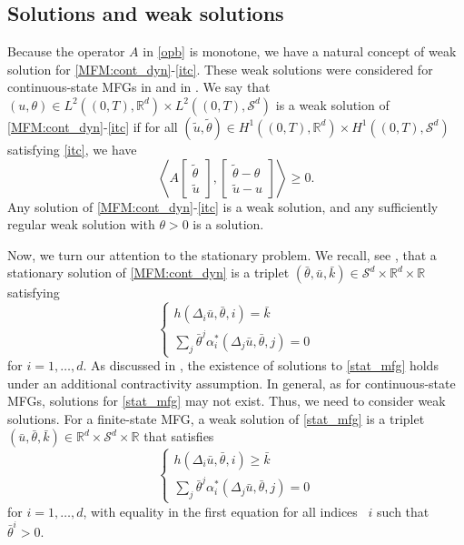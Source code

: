 \documentclass[12pt]{amsart}
\newcommand{\Rr}{{\mathbb{R}}}
\newcommand{\1}{{\chi}}
\newcommand{\Ss}{\mathcal{S}}
\theoremstyle{definition}
\begin{document}
\subsection{Solutions and weak solutions}

Because the operator $A$ in \eqref{opb} is monotone, we have a natural
concept of weak solution for \eqref{MFM:cont_dyn}-\eqref{itc}. 
These weak solutions were considered for continuous-state MFGs in \cite{AFG} and in \cite{FG2}.
We say that $(u, \theta)\in L^2((0,T), \Rr^d)\times L^2((0,T), \Ss^d) $ is a weak solution of \eqref{MFM:cont_dyn}-\eqref{itc} if
for all  $(\tilde u, \tilde \theta)\in H^1((0,T), \Rr^d)\times H^1((0,T), \Ss^d)$ satisfying \eqref{itc}, 
we have
\[
\left\langle
A\left[
\begin{array}{c}
\tilde \theta\\
\tilde u
\end{array}\right], 
\left[
\begin{array}{c}
\tilde \theta-\theta\\
\tilde u-u
\end{array}\right]
\right\rangle\geq 0.
\]
Any solution of \eqref{MFM:cont_dyn}-\eqref{itc} is a weak solution, and any sufficiently regular weak solution with $\theta>0$ is a solution. 

Now, we turn our attention to the stationary problem.
        We recall, see \cite{GMS2}, that a stationary solution of \eqref{MFM:cont_dyn} is a triplet $(\bar \theta,\bar u, \bar k) \in \Ss^d \times \Rr^d \times \Rr$ satisfying
        \begin{equation} \label{stat_mfg}
        \begin{cases}
        h(\Delta_i \bar u, \bar \theta, i) = \bar k \\
        \sum_{j} \bar \theta^j \alpha^*_i (\Delta_j \bar u, \bar \theta,j) = 0
        \end{cases}
        \end{equation}
        for $i=1,\ldots,d$.
As discussed in \cite{GMS2},
the existence of solutions to \eqref{stat_mfg} holds under an additional 
contractivity assumption. In general, as for continuous-state MFGs, solutions for \eqref{stat_mfg} 
may not exist. Thus, we need to consider weak solutions.
For a finite-state MFG, a weak solution
of \eqref{stat_mfg} is a triplet
$(\bar u, \bar \theta, \bar k)\in \Rr^d\times\Ss^d\times \Rr$ that satisfies
        \begin{equation} \label{stat_mfg_ws}
        \begin{cases}
        h(\Delta_i \bar u, \bar \theta, i) \geq \bar   k \\
        \sum_{j} \bar \theta^j \alpha^*_i (\Delta_j \bar u, \bar \theta,j)
                = 0
        \end{cases}
        \end{equation}
        for $i=1,\ldots,d$, with equality in the first equation for all indices ~$i$ such that $\bar \theta^i>0$. 
\end{document}
